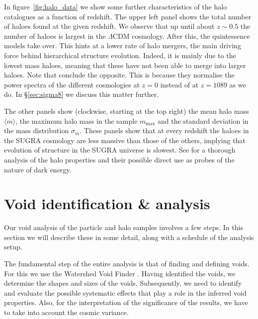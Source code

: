 In figure~\ref{fig:halo_data} we show some further characteristics of the halo catalogues as a function of redshift. 
The upper left panel shows the total number of haloes found at the given redshift. We observe that up until about $z \sim 0.5$ the 
number of haloes is largest in the $\Lambda$CDM cosmology. After this, the quintessence models take over. This hints at a lower rate 
of halo mergers, the main driving force behind hierarchical structure evolution. Indeed, it is mainly due to the lowest mass haloes, 
meaning that these have not been able to merge into larger haloes. Note that \citet{klypin03} conclude the opposite. This is because 
they normalise the power spectra of the different cosmologies at $z=0$ instead of at $z=1089$ as we do. In \S\ref{sec:sigma8} we 
discuss this matter further.

The other panels show (clockwise, starting at the top right) the mean halo mass $\langle m\rangle$, the maximum halo mass in the 
sample $m_\mathrm{max}$ and the standard deviation in the mass distribution $\sigma_m$. These panels show that at every redshift 
the haloes in the SUGRA cosmology are less massive than those of the others, implying that evolution of structure in the SUGRA 
universe is slowest. See \citet{deboni11} for a thorough analysis of the halo properties and their possible direct use as probes 
of the nature of dark energy.

\section{Void identification \& analysis}
\label{sec:voidID}
Our void analysis of the particle and halo samples involves a few steps. In this section 
we will describe these in some detail, along with a schedule of the analysis setup. 

The fundamental step of the entire analysis is that of finding and defining voids. For this we use the 
Watershed Void Finder \citep{platen07}. Having identified the voids, we determine the shapes and sizes of 
the voids. Subsequently, we need to identify and evaluate the possible systematic effects that 
play a role in the inferred void properties. Also, for the interpretation of the significance of 
the results, we have to take into account the cosmic variance. 

